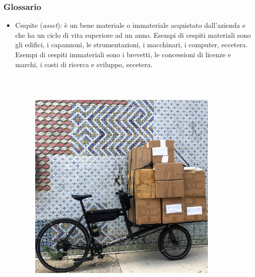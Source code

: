 \documentclass[]{beamer}
\begin{document}
\begin{frame}
\frametitle{Glossario}
\begin{itemize} 
  \item \alert{Cespite (\emph{asset}):} è un bene materiale o immateriale acquistato dall'azienda e che ha un ciclo di vita superiore ad un anno. Esempi di cespiti materiali sono gli edifici, i capannoni, le strumentazioni, i macchinari, i computer, eccetera. Esempi di cespiti immateriali sono i brevetti, le concessioni di licenze e marchi, i costi di ricerca e sviluppo, eccetera.
  
  ~
  
  \begin{columns}
    \begin{column}{.4\textwidth}
      \begin{figure}
        \includegraphics[width=\columnwidth]{img/cargobike.jpg}
      \end{figure}
    \end{column}
    \begin{column}{.4\textwidth}
      \begin{figure}

\end{figure}
\end{column}
\end{columns}
\end{itemize}
\end{frame}
\end{document}

